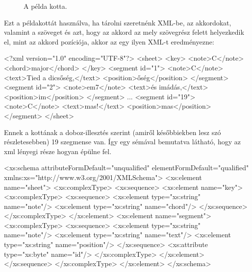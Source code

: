 \begin{figure}[h]
	\caption{A példa kotta.}
	\label{fig:song1}
\end{figure}

Ezt a példakottát használva, ha tárolni szeretnénk XML-be, az akkordokat, valamint a szöveget és azt, hogy az akkord az mely szövegrész felett helyezkedik el, mint az akkord pozíciója, akkor az egy ilyen XML-t eredményezne:
\begin{xml}
<?xml version="1.0" encoding="UTF-8"?>
<sheet>
   <key>
      <note>C</note>
      <chord>major</chord>
   </key>
   <segment id="1">
      <note>C</note>
      <text>Tied a dicsőség,</text>
      <position>őség</position>
   </segment>
   <segment id="2">
      <note>em7</note>
      <text>és imádás,\n</text>
      <position>im</position>
   </segment>
   ...
   <segment id="19">
      <note>C</note>
      <text>mas!</text>
      <position>mas</position>
   </segment>
</sheet>
\end{xml}

Ennek a kottának a doboz-illesztés szerint (amiről későbbiekben lesz szó részletesebben) 19 szegmense van. Így egy sémával bemutatva látható, hogy az xml lényegi része hogyan épülne fel.
\begin{xml}
<xs:schema attributeFormDefault="unqualified" elementFormDefault="qualified" xmlns:xs="http://www.w3.org/2001/XMLSchema">
  <xs:element name="sheet">
    <xs:complexType>
      <xs:sequence>
        <xs:element name="key">
          <xs:complexType>
            <xs:sequence>
              <xs:element type="xs:string" name="note"/>
              <xs:element type="xs:string" name="chord"/>
            </xs:sequence>
          </xs:complexType>
        </xs:element>
        <xs:element name="segment">
          <xs:complexType>
            <xs:sequence>
              <xs:element type="xs:string" name="note"/>
              <xs:element type="xs:string" name="text"/>
              <xs:element type="xs:string" name="position"/>
            </xs:sequence>
            <xs:attribute type="xs:byte" name="id"/>
          </xs:complexType>
        </xs:element>
      </xs:sequence>
    </xs:complexType>
  </xs:element>
</xs:schema>
\end{xml}

